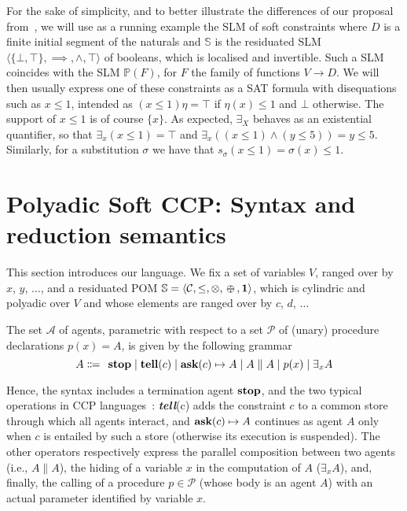 \documentclass{llncs}
\def\1{{\mathbf 1}}
\newcommand{\tell}{{\bf tell}}
\newcommand{\ask}{{\bf ask}}
\newcommand{\ostop}{{\bf stop}}
\def\1{{\mathbf 1}}
\def\odiv{\, {\ominus\hspace{-7.7pt} \div} \,}
\begin{document}
\begin{example}
For the sake of simplicity, and to better illustrate the differences of our proposal from~\cite{pippo},
we will use as a running example
the SLM of soft constraints where 
$D$ is a finite initial segment of the naturals and
$\mathbb{S}$ is the residuated SLM $\langle \{\bot, \top\}, \implies, \wedge, \top \rangle$
of booleans, which is localised and invertible.
Such a SLM coincides with the SLM $\mathbb{P}(F)$, for $F$ the family of functions 
$V \rightarrow D$.
%
We will then usually express one of these constraints as a SAT formula with disequations such as $x \leq 1$, 
intended as $(x \leq 1)\eta = \top$ if $\eta(x) \leq 1$ and $\bot$ otherwise. The support of $x \leq 1$ is of course $\{x\}$.
As expected, $\exists_X$ behaves as an existential quantifier, so that 
$\exists_x (x \leq 1) = \top$ and $\exists_x ((x \leq 1) \wedge  (y \leq 5)) = y \leq 5$.
Similarly, for a substitution $\sigma$ we have that $s_\sigma(x \leq 1) = \sigma(x) \leq 1$. 

\end{example}

\section{Polyadic Soft CCP: Syntax and reduction semantics}\label{sec:detpolyadicCCP}
This section introduces our language.
We fix a set of variables $V$, ranged over by $x$, $y$, $\ldots$, and 
a residuated POM $\mathbb S = \langle {\mathcal C}, \leq, \otimes, \odiv, \1\rangle$, 
which is cylindric and polyadic over $V$ and whose elements
are ranged over by $c$, $d$, $\ldots$

\begin{definition}[Agents]%
The set $\mathcal{A}$ of agents, %
parametric with respect to a set $\mathcal{P}$ of (unary) procedure declarations $p(x) = A$,
is given by the following grammar
\[ A \Coloneqq \: \: \mathit{\ostop} \mid \textit{\tell}(c)  \mid \textit{\ask}(c) \mapsto A \mid A \parallel A \mid %
p(x) \mid \exists_x A\]  
\end{definition}

Hence, the syntax includes a termination agent $\mathit{\ostop}$, and the two typical operations in CCP languages~\cite{popl91}: \textit{\tell}(c) adds the
constraint $c$ to a common store through which all agents interact, and $\textit{\ask}(c) \mapsto A$ continues as agent $A$ only when $c$ is entailed by 
such a store (otherwise its execution is suspended). The other operators respectively express the parallel composition between two agents 
(i.e., $A \parallel A$), the hiding of a variable $x$ in the computation of $A$ ($\exists_x A$), and, finally, the calling of a procedure $p \in \mathcal{P}$ 
(whose body is an agent $A$) with an actual parameter identified by variable $x$.
\end{document}

